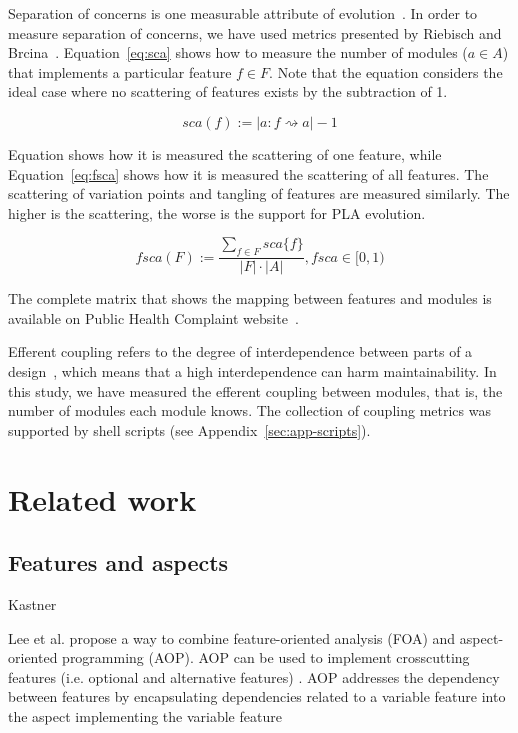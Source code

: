 \documentclass[11pt,twoside]{article}
\begin{document}
Separation of concerns is one measurable attribute of evolution~\cite{Brcina:2009:OPM}. In order to measure separation of concerns, we have used
metrics presented by Riebisch and
Brcina~\cite{Riebisch:2008:ODV}. Equation~\ref{eq:sca} shows how to measure the number of modules ($a \in A$) that implements a particular
feature $f \in F$. Note that the equation considers the ideal case where no scattering of features exists by the subtraction of 1.

\begin{equation}\label{eq:sca}
sca(f):=|{a:f\rightsquigarrow a}|-1 
\end{equation}

Equation shows how it is measured the scattering of one feature, while Equation~\ref{eq:fsca} shows how it is measured the
scattering of all features. The scattering of variation points and tangling of features are measured similarly. The higher is
the
scattering, the worse is the support
for PLA evolution.

\begin{equation}\label{eq:fsca}
fsca(F):= \frac{\sum_{f\in F}sca\{f\}}{|F|\cdot|A|}, fsca \in [0,1)
\end{equation}

The complete matrix that shows the mapping between features and modules is available on Public Health Complaint website~\cite{phc}.

Efferent coupling refers to the degree of interdependence between parts of a design~\cite{Chidamber:1994:MSO}, which means that a high
interdependence can harm maintainability. In this study, we have measured the efferent coupling between modules, that is, the number of modules each module knows.
The collection of coupling metrics was supported by shell scripts (see Appendix~\ref{sec:app-scripts}).

\section{Related work}

\subsection{Features and aspects}
Kastner

Lee et al. propose a way to combine feature-oriented analysis (FOA) and aspect-oriented programming (AOP). AOP can be used to implement crosscutting
features (i.e. optional and alternative features) . AOP addresses the dependency between features by encapsulating dependencies related to a variable
feature into the aspect implementing the variable feature
\end{document}
